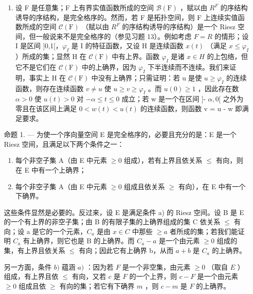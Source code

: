\begin{enumerate}
\def\labelenumi{\arabic{enumi})}
\setcounter{enumi}{1}
\tightlist
\item
  设 F 是任意集；F 上有界实值函数所成的空间 \(\mathcal{B}(\mathrm{F})\) ，赋以由 \(R^{F}\) 的序结构诱导的序结构，是完全格序的。然而，若 F 是拓扑空间，则 F 上连续实值函数所成的空间 \(\mathcal{C}(\mathrm{F})\) （赋以由 \(R^{F}\) 的序结构诱导的序结构）是一个 Riesz 空间，但一般说来不是完全格序的（参见习题 13）。例如考虑 \(F = R\) 的情形；设 I 是区间 {]}0,1{[}，\(\varphi_{I}\) 是 I 的特征函数，又设 H 是连续函数 \(x(t)\) （满足 \(x \leqslant \varphi_{I}\) ）所成的集；显然 H 在 \(\mathcal{C}(\mathrm{F})\) 中有上界。函数 \(\varphi_{I}\) 是诸 \(x \in H\) 的上包络，但它不是它们在 \(\mathcal{C}(\mathrm{F})\) 中的上确界，因为 \(\varphi_{I}\) 下半连续而不连续。我们来证明，事实上 H 在 \(\mathcal{C}(\mathrm{F})\) 中没有上确界；只需证明：若 u 是使 \(u \geqslant \varphi_{I}\) 的连续函数，则存在连续函数 \(v \neq u\) 使 \(u \geqslant v \geqslant \varphi_{I}\) 。而 \(u(0) \geqslant 1\) ，因此存在数 \(\alpha > 0\) 使 \(u(t) > 0\) 对 \(-\alpha \leqslant t \leqslant 0\) 成立；若 w 是一个在区间 {]}- \(\alpha,0[\) 之外为零且在该区间上满足 \(0 < w(t) < u(t)\) 的连续函数，则函数 v = u - w 即满足要求。
\end{enumerate}

命题 1. --- 为使一个序向量空间 E 是完全格序的，必要且充分的是：E 是一个 Riesz 空间，且满足以下两个条件之一：

\begin{enumerate}
\def\labelenumi{\alph{enumi})}
\item
  每个非空子集 A（由 E 中元素 \(\geqslant0\) 组成），若有上界且依关系 \(\leqslant\) 有向，则在 E 中有一个上确界；
\item
  每个非空子集 A（由 E 中元素 \(\geqslant 0\) 组成且依关系 \(\geqslant\) 有向），在 E 中有一个下确界。
\end{enumerate}

这些条件显然是必要的。反过来，设 E 是满足条件 a) 的 Riesz 空间。设 B 是 E 的一个有上界的非空子集；由 B 的有限子集的上确界组成的集 C 依关系 \(\leqslant\) 有向；设 a 是它的一个元素，\(C_{a}\) 是由 \(x \in C\) 中那些 \(\geqslant a\) 者所成的集；若我们能证明 \(C_{a}\) 有上确界，则它也是 B 的上确界。而 \(C_{a} - a\) 是一个由元素 \(\geqslant 0\) 组成的集，有上界且依关系 \(\leqslant\) 有向；因此它有上确界 b，从而 \(a + b\) 是 \(C_{a}\) 的上确界。

另一方面，条件 \(b)\) 蕴涵 \(a)\) ：因为若 \(F\) 是一个非空集，由元素 \(\geqslant 0\) （取自 \(E\) ）组成，有上界且依 \(\leqslant\) 有向，又若 \(c\) 是 \(F\) 的一个上界，则 \(c - F\) 是一个由元素 \(\geqslant 0\) 组成且依 \(\geqslant\) 有向的集；若它有下确界 \(m\) ，则 \(c - m\) 是 \(F\) 的上确界。

